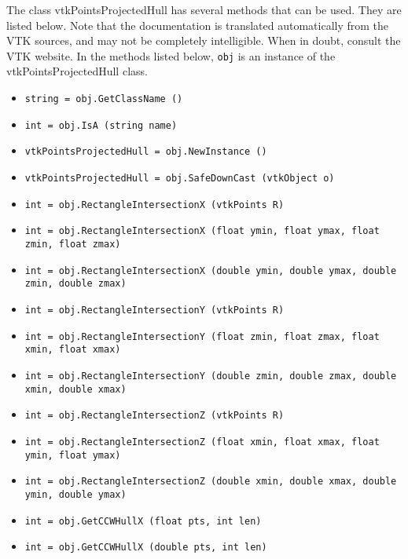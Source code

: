 The class vtkPointsProjectedHull has several methods that can be used.
  They are listed below.
Note that the documentation is translated automatically from the VTK sources,
and may not be completely intelligible.  When in doubt, consult the VTK website.
In the methods listed below, \verb|obj| is an instance of the vtkPointsProjectedHull class.
\begin{itemize}
\item  \verb|string = obj.GetClassName ()|

\item  \verb|int = obj.IsA (string name)|

\item  \verb|vtkPointsProjectedHull = obj.NewInstance ()|

\item  \verb|vtkPointsProjectedHull = obj.SafeDownCast (vtkObject o)|

\item  \verb|int = obj.RectangleIntersectionX (vtkPoints R)|

\item  \verb|int = obj.RectangleIntersectionX (float ymin, float ymax, float zmin, float zmax)|

\item  \verb|int = obj.RectangleIntersectionX (double ymin, double ymax, double zmin, double zmax)|

\item  \verb|int = obj.RectangleIntersectionY (vtkPoints R)|

\item  \verb|int = obj.RectangleIntersectionY (float zmin, float zmax, float xmin, float xmax)|

\item  \verb|int = obj.RectangleIntersectionY (double zmin, double zmax, double xmin, double xmax)|

\item  \verb|int = obj.RectangleIntersectionZ (vtkPoints R)|

\item  \verb|int = obj.RectangleIntersectionZ (float xmin, float xmax, float ymin, float ymax)|

\item  \verb|int = obj.RectangleIntersectionZ (double xmin, double xmax, double ymin, double ymax)|

\item  \verb|int = obj.GetCCWHullX (float pts, int len)|

\item  \verb|int = obj.GetCCWHullX (double pts, int len)|


\end{itemize}
